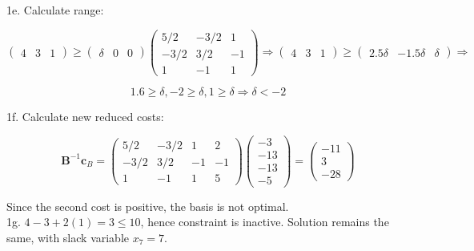 \documentclass{article}
\begin{document}
1e. Calculate range:

\begin{displaymath}
\left( \begin{array}{ccc} 4 & 3 & 1 \end{array} \right) \ge
\left( \begin{array}{ccc} \delta & 0 & 0 \end{array} \right)
\left( \begin{array}{rrr}
5/2 & -3/2 & 1 \\
-3/2 & 3/2 & -1 \\
1 & -1 & 1
\end{array} \right) \Rightarrow
\left( \begin{array}{ccc} 4 & 3 & 1 \end{array} \right) \ge
\left( \begin{array}{ccc} 2.5 \delta & -1.5 \delta & \delta \end{array} \right) \Rightarrow
\end{displaymath}

\begin{displaymath}
1.6 \ge \delta, -2 \ge \delta, 1 \ge \delta \Rightarrow
\delta < -2
\end{displaymath}

1f. Calculate new reduced costs:

\begin{displaymath}
\textbf{B}^{-1} \textbf{c}_B =
\left( \begin{array}{rrrr}
5/2 & -3/2 & 1 & 2 \\
-3/2 & 3/2 & -1 & -1 \\
1 & -1 & 1 & 5
\end{array} \right)
\left( \begin{array}{c} -3 \\ -13 \\ -13 \\ -5 \end{array} \right) =
\left( \begin{array}{c} -11 \\ 3 \\ -28 \end{array} \right)
\end{displaymath}

Since the second cost is positive, the basis is not optimal. \\

1g. $4 - 3 + 2(1) = 3 \le 10$, hence constraint is inactive. Solution remains the same, with slack variable $x_7 = 7$.

\end{document}
